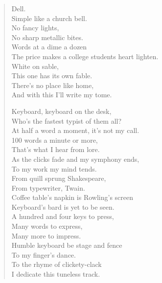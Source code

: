 \documentclass[11pt,letterpaper]{article}
\begin{document}
\begin{verse}
Dell.\\ 
Simple like a church bell.\\ 
No fancy lights,\\ 
No sharp metallic bites.\\ 
Words at a dime a dozen\\ 
The price makes a college students heart lighten.\\ 
White on sable,\\ 
This one has its own fable.\\ 
There's no place like home,\\ 
And with this I'll write my tome. 
 
Keyboard, keyboard on the desk,\\ 
Who's the fastest typist of them all?\\ 
At half a word a moment, it's not my call.\\ 
100 words a minute or more,\\ 
That's what I hear from lore.\\ 
As the clicks fade and my symphony ends,\\ 
To my work my mind tends.\\ 
From quill sprung Shakespeare,\\ 
From typewriter, Twain.\\ 
Coffee table's napkin is Rowling's screen\\ 
Keyboard's bard is yet to be seen.\\ 

A hundred and four keys to press,\\ 
Many words to express,\\ 
Many more to impress.\\ 
Humble keyboard be stage and fence\\ 
To my finger's dance.\\ 
To the rhyme of clickety-clack\\ 
I dedicate this tuneless track. 
\end{verse}

\end{document}
